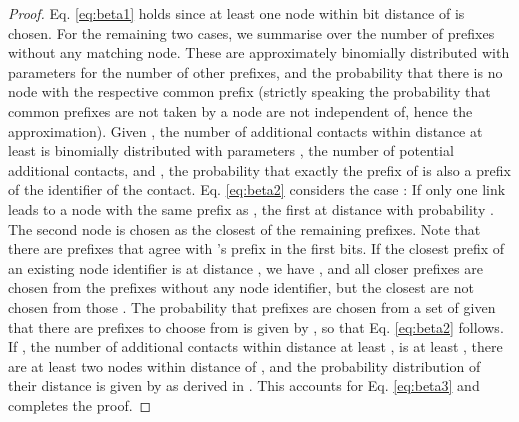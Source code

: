 \documentclass[10pt, conference, compsocconf, letterpaper]{IEEEtran}
\begin{document}
\begin{proof}
Eq. \ref{eq:beta1} holds since at least one node within bit distance  of
 is chosen.
For the remaining two cases, we summarise over the number  of prefixes
without any matching node. These are approximately binomially distributed with parameters  for the number of other prefixes, and the probability
that there is no node with the respective common prefix (strictly speaking the
probability that common prefixes are not taken by a node are not independent of,
hence the approximation).
Given , the number of additional contacts  within distance at least
 is binomially distributed with parameters , the number
of potential additional contacts, and , the probability that exactly
the prefix of  is also a prefix of the identifier of the contact.
Eq. \ref{eq:beta2} considers the case : 
If only one link leads to a node with the same prefix as , the 
first at distance  with probability . 
The second node is chosen as the closest of the  remaining prefixes. Note that there are  prefixes that agree with 's
prefix in the first  bits. 
If the closest prefix of an existing node identifier is at distance , we have
, and all closer  prefixes are chosen from the  prefixes
without any node identifier, but the closest  are not chosen from
those .  The probability that  prefixes are chosen from a set of 
given that there are  prefixes to choose from is given by
, so that Eq. \ref{eq:beta2} follows.
If , the number of additional contacts within distance at least , is at least , there are at least two nodes within distance  of ,
and the probability distribution of their distance is given by 
 as derived in \cite{roos13comprehending}.
This accounts for Eq. \ref{eq:beta3} and completes the proof.\end{proof}
\end{document}
